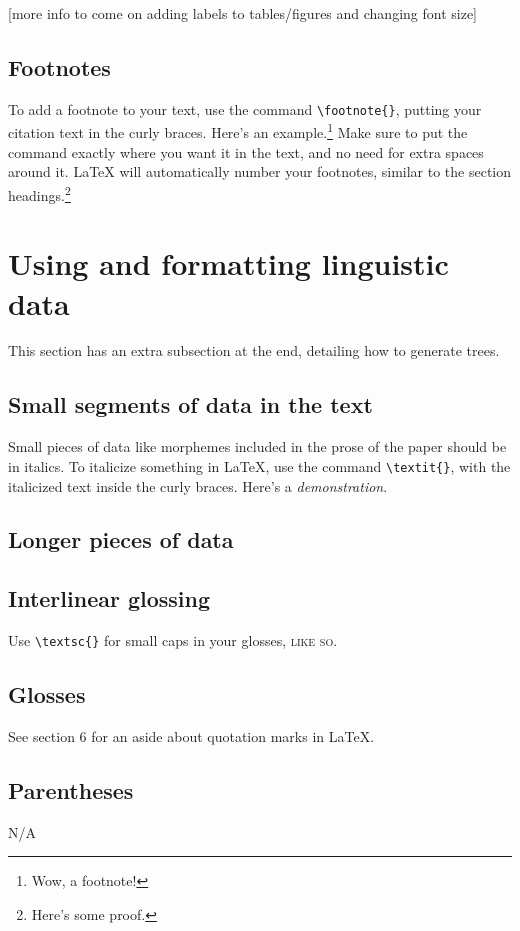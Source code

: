 \documentclass[12pt]{article}
\begin{document}
	[more info to come on adding labels to tables/figures and changing font size]
	
	\subsection{Footnotes}
	To add a footnote to your text, use the command \verb|\footnote{}|, putting your citation text in the curly braces. Here's an example.\footnote{Wow, a footnote!} Make sure to put the command exactly where you want it in the text, and no need for extra spaces around it. LaTeX will automatically number your footnotes, similar to the section headings.\footnote{Here's some proof.}
	
	\section{Using and formatting linguistic data}
	This section has an extra subsection at the end, detailing how to generate trees.
	
	\subsection{Small segments of data in the text}
	Small pieces of data like morphemes included in the prose of the paper should be in italics. To italicize something in LaTeX, use the command \verb|\textit{}|, with the italicized text inside the curly braces. Here's a \textit{demonstration}.
	
	\subsection{Longer pieces of data}
	
	\subsection{Interlinear glossing}
	Use \verb|\textsc{}| for small caps in your glosses, \textsc{like so}.
	
	\subsection{Glosses}
	See section 6 for an aside about quotation marks in LaTeX.
	
	\subsection{Parentheses}
	N/A
	
\end{document}
